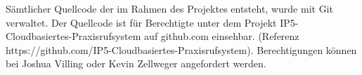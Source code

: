 Sämtlicher Quellcode der im Rahmen des Projektes entsteht, wurde mit Git verwaltet.
Der Quellcode ist für Berechtigte unter dem Projekt IP5-Cloudbasiertes-Praxisrufsystem auf github.com einsehbar.
(Referenz https://github.com/IP5-Cloudbasiertes-Praxisrufsystem).
Berechtigungen können bei Joshua Villing oder Kevin Zellweger angefordert werden.

\clearpage




\clearpage



